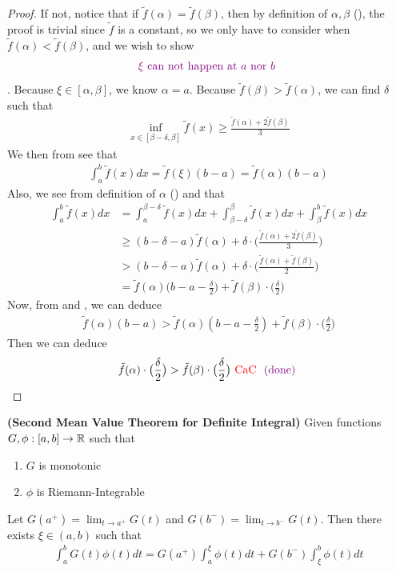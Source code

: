 \documentclass{report}
\begin{document}
\begin{proof}
If not, notice that if $\tilde{f}(\alpha )=\tilde{f}(\beta )$, then by definition of $\alpha ,\beta $ (), the proof is trivial since $\tilde{f}$ is a constant, so we only have to consider when $\tilde{f}(\alpha )<\tilde{f}(\beta )  $, and we wish to show
\begin{align*}
\textcolor{violet}{\xi \text{ can not happen at $a$ nor $b$ }}
\end{align*}
. Because $\xi \in [\alpha ,\beta ]$, we know $\alpha =a$. Because $\tilde{f}(\beta )>\tilde{f}(\alpha )  $, we can find $\delta $ such that 
\begin{align}
\label{M5}
\inf_{x \in [\beta  -\delta, \beta  ]}\tilde{f}(x)\geq \frac{\tilde{f}(\alpha )+2\tilde{f}(\beta )  }{3}
\end{align}
We then from  see that 
\begin{align}
\label{M6}
\int_a^b \tilde{f}(x)dx=\tilde{f}(\xi)(b-a)=\tilde{f}(\alpha ) (b-a)
\end{align}
Also, we see from definition of $\alpha $ () and  that 
\begin{align}
\int_a^b \tilde{f}(x)dx&=\int_a^{\beta -\delta} \tilde{f}(x)dx + \int_{\beta -\delta}^{\beta  } \tilde{f}(x)dx+\int_{\beta }^{b}\tilde{f}(x)dx \\
&\geq (b -\delta -a) \tilde{f}(\alpha ) + \delta \cdot  \big( \frac{\tilde{f}(\alpha )+2\tilde{f}(\beta )  }{3}\big)\\
&> (b -\delta -a) \tilde{f}(\alpha ) + \delta \cdot  \big( \frac{\tilde{f}(\alpha )+\tilde{f}(\beta )  }{2}\big)\\
&=\tilde{f}(\alpha ) \big(b-a-\frac{\delta}{2} \big) + \tilde{f}(\beta ) \cdot \big( \frac{\delta}{2}\big)
 \label{M7}
\end{align}
Now, from  and , we can deduce  
\begin{align*}
\tilde{f}(\alpha )(b-a)> \tilde{f}(\alpha )(b-a-\frac{\delta}{2}) +\tilde{f}(\beta ) \cdot \big(\frac{\delta}{2} \big)
\end{align*}
Then we can deduce
\begin{align*}
\tilde{f}(\alpha )\cdot \big(\frac{\delta}{2} \big)>\tilde{f}(\beta )\cdot \big(\frac{\delta}{2} \big) \text{ \textcolor{red}{CaC} } \textcolor{violet}{\text{ (done) }}
\end{align*}
\end{proof}
\begin{theorem}
\textbf{(Second Mean Value Theorem for Definite Integral)} Given functions $G,\phi :[a,b]\rightarrow \mathbb{R}$ such that 
\begin{enumerate}[label=(\alph*)]
  \item $G$ is monotonic
  \item $\phi$ is Riemann-Integrable
\end{enumerate}
Let $G(a^+)=\lim_{t\to a^+}G(t)$ and $G(b^-)=\lim_{t\to b^-}G(t)$. Then there exists $\xi \in (a,b)$ such that 
\begin{align*}
\int_a^b G(t)\phi (t)dt= G(a^+)\int_a^{\xi} \phi(t)dt+G(b^-)\int_\xi^{b}\phi (t)dt
\end{align*}
\end{theorem}
\end{document}

